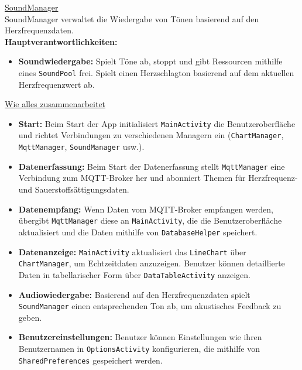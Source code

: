 \documentclass[conference,a4paper,flushend]{cs-techrep}
\begin{document}
\underline{SoundManager}\vspace{0.5em}\\
SoundManager verwaltet die Wiedergabe von Tönen basierend auf den Herzfrequenzdaten.\vspace{0.5em}\\
\textbf{Hauptverantwortlichkeiten:}
\vspace{0.5em}
\begin{itemize}
    \item \textbf{Soundwiedergabe:} Spielt Töne ab, stoppt und gibt Ressourcen mithilfe eines \texttt{SoundPool} frei. Spielt einen Herzschlagton basierend auf dem aktuellen Herzfrequenzwert ab.
\end{itemize}

\underline{Wie alles zusammenarbeitet}\\
\begin{itemize}
    \item \textbf{Start:} Beim Start der App initialisiert \texttt{MainActivity} die Benutzeroberfläche und richtet Verbindungen zu verschiedenen Managern ein (\texttt{ChartManager}, \texttt{MqttManager}, \texttt{SoundManager} usw.).
    \vspace{0.5em}
    \item \textbf{Datenerfassung:} Beim Start der Datenerfassung stellt \texttt{MqttManager} eine Verbindung zum MQTT-Broker her und abonniert Themen für Herzfrequenz- und Sauerstoffsättigungsdaten.
    \vspace{0.5em}
    \item \textbf{Datenempfang:} Wenn Daten vom MQTT-Broker empfangen werden, übergibt \texttt{MqttManager} diese an \texttt{MainActivity}, die die Benutzeroberfläche aktualisiert und die Daten mithilfe von \texttt{DatabaseHelper} speichert.
    \vspace{0.5em}
    \item \textbf{Datenanzeige:} \texttt{MainActivity} aktualisiert das \texttt{LineChart} über \texttt{ChartManager}, um Echtzeitdaten anzuzeigen. Benutzer können detaillierte Daten in tabellarischer Form über \texttt{DataTableActivity} anzeigen.
    \vspace{0.5em}
    \item \textbf{Audiowiedergabe:} Basierend auf den Herzfrequenzdaten spielt \texttt{SoundManager} einen entsprechenden Ton ab, um akustisches Feedback zu geben.
    \vspace{0.5em}
    \item \textbf{Benutzereinstellungen:} Benutzer können Einstellungen wie ihren Benutzernamen in \texttt{OptionsActivity} konfigurieren, die mithilfe von \texttt{SharedPreferences} gespeichert werden.
\end{itemize}
\vspace{0.5em}
\end{document}
